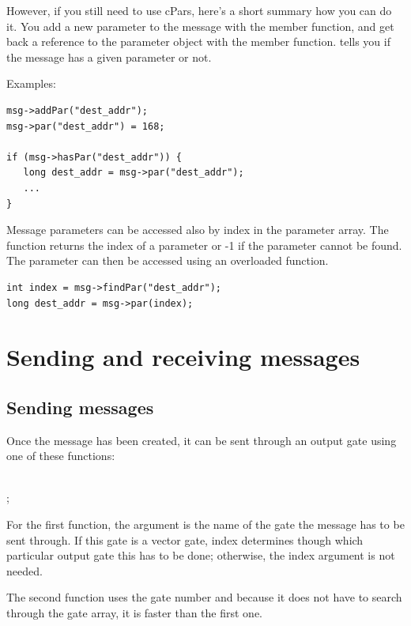 However, if you still need to use cPars, here's a short summary
how you can do it.
You add a new parameter to the message with the
 member function, and get back a reference
to the parameter object with the  member function.
 tells you if the message has a
given parameter or not.

Examples:

\begin{verbatim}
msg->addPar("dest_addr");
msg->par("dest_addr") = 168;

if (msg->hasPar("dest_addr")) {
   long dest_addr = msg->par("dest_addr");
   ...
}
\end{verbatim}

Message parameters can be accessed also by index in the parameter
array. The  function returns the index of a parameter
or -1 if the parameter cannot be found. The parameter can then be
accessed using an overloaded  function.

\begin{verbatim}
int index = msg->findPar("dest_addr");
long dest_addr = msg->par(index);
\end{verbatim}


\section{Sending and receiving messages}

\subsection{Sending messages}

Once the message has been created, it can be sent through an
output gate using one of these functions:

\\
;



For the first function, the argument  is the name of
the gate the message has to be sent through. If this gate is
a vector gate, index determines though which particular output
gate this has to be done; otherwise, the index argument is not
needed.

The second function uses the gate number and because it does
not have to search through the gate array, it is faster than
the first one.


